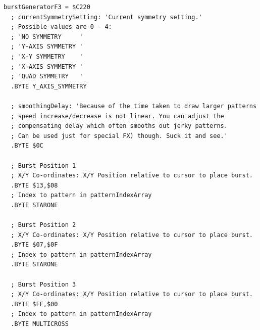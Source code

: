 \begin{lstlisting}[caption=Source code for the F3 Burst.]
burstGeneratorF3 = $C220
  ; currentSymmetrySetting: 'Current symmetry setting.'
  ; Possible values are 0 - 4:
  ; 'NO SYMMETRY     '
  ; 'Y-AXIS SYMMETRY '
  ; 'X-Y SYMMETRY    '
  ; 'X-AXIS SYMMETRY '
  ; 'QUAD SYMMETRY   '
  .BYTE Y_AXIS_SYMMETRY

  ; smoothingDelay: 'Because of the time taken to draw larger patterns
  ; speed increase/decrease is not linear. You can adjust the 
  ; compensating delay which often smooths out jerky patterns.
  ; Can be used just for special FX) though. Suck it and see.'
  .BYTE $0C

  ; Burst Position 1
  ; X/Y Co-ordinates: X/Y Position relative to cursor to place burst.
  .BYTE $13,$08
  ; Index to pattern in patternIndexArray
  .BYTE STARONE

  ; Burst Position 2
  ; X/Y Co-ordinates: X/Y Position relative to cursor to place burst.
  .BYTE $07,$0F
  ; Index to pattern in patternIndexArray
  .BYTE STARONE

  ; Burst Position 3
  ; X/Y Co-ordinates: X/Y Position relative to cursor to place burst.
  .BYTE $FF,$00
  ; Index to pattern in patternIndexArray
  .BYTE MULTICROSS

\end{lstlisting}

